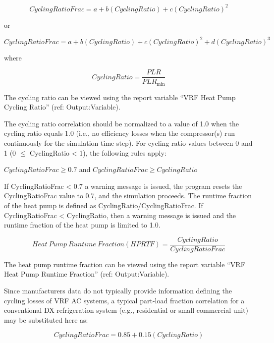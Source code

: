 \begin{equation}
  CyclingRatioFrac = a + b \left( CyclingRatio \right) + c \left( CyclingRatio \right)^2
\end{equation}

or

\begin{equation}
  CyclingRatioFrac = a + b \left( CyclingRatio \right) + c \left( CyclingRatio \right)^2 + d \left( CyclingRatio \right)^3
\end{equation}

where

\begin{equation}
  CyclingRatio = \frac{PLR}{PLR_{\min }}
\end{equation}

The cycling ratio can be viewed using the report variable ``VRF Heat Pump Cycling Ratio'' (ref: Output:Variable).

The cycling ratio correlation should be normalized to a value of 1.0 when the cycling ratio equals 1.0 (i.e., no efficiency losses when the compressor(s) run continuously for the simulation time step). For cycling ratio values between 0 and 1 (0 \(\leq\) CyclingRatio < 1), the following rules apply:

\(CyclingRatioFrac \geq 0.7\)   and   \(CyclingRatioFrac \geq CyclingRatio\)

If CyclingRatioFrac < 0.7 a warning message is issued, the program resets the CyclingRatioFrac value to 0.7, and the simulation proceeds. The runtime fraction of the heat pump is defined as CyclingRatio/CyclingRatioFrac. If CyclingRatioFrac < CyclingRatio, then a warning message is issued and the runtime fraction of the heat pump is limited to 1.0.

\begin{equation}
  Heat~Pump~Runtime~Fraction \left( HPRTF \right) = \frac{CyclingRatio}{CyclingRatioFrac}
\end{equation}

The heat pump runtime fraction can be viewed using the report variable ``VRF Heat Pump Runtime Fraction'' (ref: Output:Variable).

Since manufacturers data do not typically provide information defining the cycling losses of VRF AC systems, a typical part-load fraction correlation for a conventional DX refrigeration system (e.g., residential or small commercial unit) may be substituted here as:

\begin{equation}
  CyclingRatioFrac = 0.85 + 0.15(CyclingRatio)
\end{equation}

